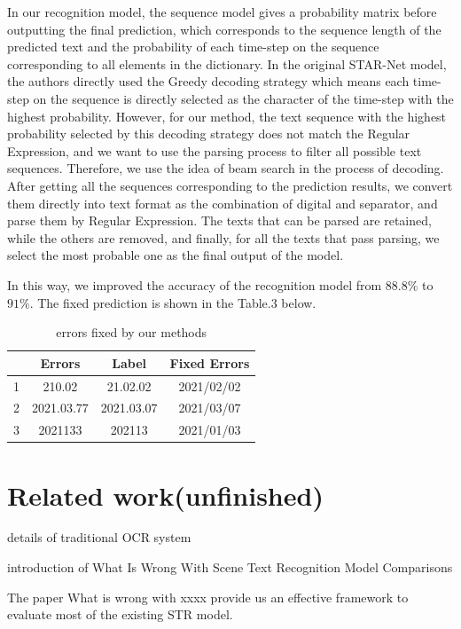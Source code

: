 \documentclass{article}
\begin{document}
In our recognition model, the sequence model gives a probability matrix before outputting the final prediction, which corresponds to the sequence length of the predicted text and the probability of each time-step on the sequence corresponding to all elements in the dictionary. In the original STAR-Net model, the authors directly used the Greedy decoding strategy which means each time-step on the sequence is directly selected as the character of the time-step with the highest probability. However, for our method, the text sequence with the highest probability selected by this decoding strategy does not match the Regular Expression, and we want to use the parsing process to filter all possible text sequences. Therefore, we use the idea of beam search in the process of decoding. After getting all the sequences corresponding to the prediction results, we convert them directly into text format as the combination of digital and separator, and parse them by Regular Expression. The texts that can be parsed are retained, while the others are removed, and finally, for all the texts that pass parsing, we select the most probable one as the final output of the model.

In this way, we improved the accuracy of the recognition model from $88.8\%$ to $91\%$. The fixed prediction is shown in the Table.3 below.

\begin{table}[]
\centering
\begin{tabular}{c|c|c|c}
  & Errors     & Label      & Fixed Errors \\ \hline
1 & 210.02     & 21.02.02   & 2021/02/02   \\ \hline
2 & 2021.03.77 & 2021.03.07 & 2021/03/07   \\ \hline
3 & 2021133    & 202113     & 2021/01/03        
\end{tabular}
\caption{errors fixed by our methods}
\label{fixed errors}
\end{table}
\section{Related work(unfinished)}

details of traditional OCR system \par
introduction of What Is Wrong With Scene Text Recognition Model Comparisons

The paper What is wrong with xxxx provide us an effective framework to evaluate most of the existing STR model.
\end{document}
